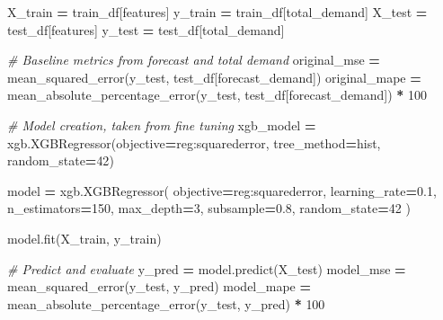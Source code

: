 \documentclass[mstat,12pt]{unswthesis}
\newenvironment{Shaded}{\begin{snugshade}}{\end{snugshade}}
\newcommand{\CommentTok}[1]{\textcolor[rgb]{0.56,0.35,0.01}{\textit{#1}}}
\newcommand{\DecValTok}[1]{\textcolor[rgb]{0.00,0.00,0.81}{#1}}
\newcommand{\FloatTok}[1]{\textcolor[rgb]{0.00,0.00,0.81}{#1}}
\newcommand{\NormalTok}[1]{#1}
\newcommand{\OperatorTok}[1]{\textcolor[rgb]{0.81,0.36,0.00}{\textbf{#1}}}
\newcommand{\StringTok}[1]{\textcolor[rgb]{0.31,0.60,0.02}{#1}}
\begin{document}
\begin{Shaded}
\begin{Highlighting}[]
\NormalTok{X\_train }\OperatorTok{=}\NormalTok{ train\_df[features]}
\NormalTok{y\_train }\OperatorTok{=}\NormalTok{ train\_df[}\StringTok{\textquotesingle{}total\_demand\textquotesingle{}}\NormalTok{]}
\NormalTok{X\_test }\OperatorTok{=}\NormalTok{ test\_df[features]}
\NormalTok{y\_test }\OperatorTok{=}\NormalTok{ test\_df[}\StringTok{\textquotesingle{}total\_demand\textquotesingle{}}\NormalTok{]}

\CommentTok{\# Baseline metrics from forecast and total demand}
\NormalTok{original\_mse }\OperatorTok{=}\NormalTok{ mean\_squared\_error(y\_test, test\_df[}\StringTok{\textquotesingle{}forecast\_demand\textquotesingle{}}\NormalTok{])}
\NormalTok{original\_mape }\OperatorTok{=}\NormalTok{ mean\_absolute\_percentage\_error(y\_test, }
\NormalTok{    test\_df[}\StringTok{\textquotesingle{}forecast\_demand\textquotesingle{}}\NormalTok{]) }\OperatorTok{*} \DecValTok{100}

\CommentTok{\# Model creation, taken from fine tuning}
\NormalTok{xgb\_model }\OperatorTok{=}\NormalTok{ xgb.XGBRegressor(objective}\OperatorTok{=}\StringTok{\textquotesingle{}reg:squarederror\textquotesingle{}}\NormalTok{, }
\NormalTok{    tree\_method}\OperatorTok{=}\StringTok{\textquotesingle{}hist\textquotesingle{}}\NormalTok{, random\_state}\OperatorTok{=}\DecValTok{42}\NormalTok{)}

\NormalTok{model }\OperatorTok{=}\NormalTok{ xgb.XGBRegressor(}
\NormalTok{    objective}\OperatorTok{=}\StringTok{\textquotesingle{}reg:squarederror\textquotesingle{}}\NormalTok{,}
\NormalTok{    learning\_rate}\OperatorTok{=}\FloatTok{0.1}\NormalTok{,}
\NormalTok{    n\_estimators}\OperatorTok{=}\DecValTok{150}\NormalTok{,}
\NormalTok{    max\_depth}\OperatorTok{=}\DecValTok{3}\NormalTok{,}
\NormalTok{    subsample}\OperatorTok{=}\FloatTok{0.8}\NormalTok{,}
\NormalTok{    random\_state}\OperatorTok{=}\DecValTok{42}
\NormalTok{)}

\NormalTok{model.fit(X\_train, y\_train)}


\CommentTok{\# Predict and evaluate}
\NormalTok{y\_pred }\OperatorTok{=}\NormalTok{ model.predict(X\_test)}
\NormalTok{model\_mse }\OperatorTok{=}\NormalTok{ mean\_squared\_error(y\_test, y\_pred)}
\NormalTok{model\_mape }\OperatorTok{=}\NormalTok{ mean\_absolute\_percentage\_error(y\_test, y\_pred) }\OperatorTok{*} \DecValTok{100}
\end{Highlighting}
\end{Shaded}
\end{document}
